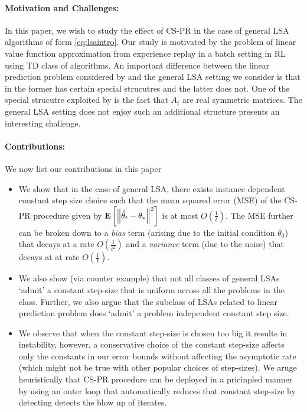 \paragraph{Motivation and Challenges:} In this paper, we wish to study the effect of CS-PR in the case of general LSA algorithms of form \eqref{eq:lsaintro}. Our study is motivated by the problem of linear value function approximation from experience replay in a batch setting in RL using TD class of algorithms. An important difference between the linear prediction problem considered by \cite{bach} and the general LSA setting we consider is that in the former has certain special strucutres and the latter does not. One of the special strucutre exploited by \cite{bach} is the fact that $A_t$ are real symmetric matrices. The general LSA setting does not enjoy such an additional structure presents an interesting challenge.\par
\paragraph{Contributions:} We now list our contributions in this paper
\begin{itemize}[leftmargin=*, before = \leavevmode\vspace{-\baselineskip}]
\item We show that in the case of general LSA, there exists instance dependent constant step size choice such that the mean squared error (MSE) of the CS-PR procedure given by $\mathbf{E}\left[\left\| \hat{\theta}_t-\theta_*\right\|^2\right]$ is at most $O(\frac{1}{t})$. The MSE further can be broken down to a \emph{bias} term (arising due to the initial condition $\theta_0$) that decays at a rate $O(\frac{1}{t^2})$ and a \emph{variance} term (due to the noise) that decays at at rate $O(\frac{1}{t})$.
 \item We also show (via counter example) that not all classes of general LSAs `admit' a constant step-size that is uniform across all the problems in the class. Further, we also argue that the subclass of LSAs related to linear prediction problem does `admit' a problem independent constant step size.
\item We observe that when the constant step-size is chosen too big it results in instability, however, a conservative choice of the constant step-size affects only the constants in our error bounds without affecting the asymptotic rate (which might not be true with other popular choices of step-sizes). We aruge heuristically that CS-PR procedure can be deployed in a pricinpled manner by using an outer loop that automatically reduces that constant step-size by detecting detects the blow up of iterates.
\end{itemize}
